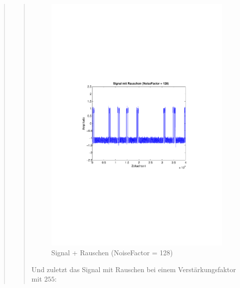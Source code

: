 \begin{quote}
\begin{quote}
         \begin{figure}[H]
        \centering
            \includegraphics[scale=0.65, trim = 1.5cm 9cm 1.5cm 9cm,
            clip]{./Bilder/aufgabe1/nf128}
                \caption{Signal + Rauschen (NoiseFactor = 128)}
        \end{figure}
        
        Und zuletzt das Signal mit Rauschen bei einem Verstärkungsfaktor mit
        $255$:
        

\end{quote}
\end{quote}
